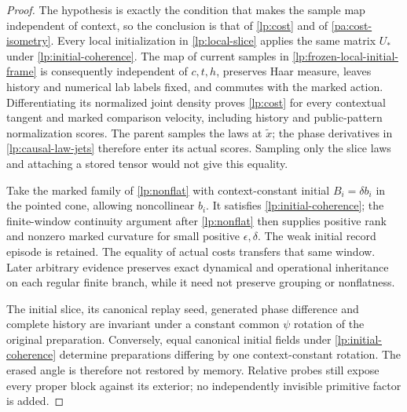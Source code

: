 \begin{proof}
The hypothesis is exactly the condition that makes the sample map independent of context, so the conclusion is that of \cref{lp:cost} and of \cref{pa:cost-isometry}. Every local initialization in \cref{lp:local-slice} applies the same matrix $U_*$ under \cref{lp:initial-coherence}. The map of current samples in \cref{lp:frozen-local-initial-frame} is consequently independent of $c,t,h$, preserves Haar measure, leaves history and numerical lab labels fixed, and commutes with the marked action. Differentiating its normalized joint density proves \cref{lp:cost} for every contextual tangent and marked comparison velocity, including history and public-pattern normalization scores. The parent samples the laws at $\widetilde x$; the phase derivatives in \cref{lp:causal-law-jets} therefore enter its actual scores. Sampling only the slice laws and attaching a stored tensor would not give this equality.

Take the marked family of \cref{lp:nonflat} with context-constant initial $B_i=\delta b_i$ in the pointed cone, allowing noncollinear $b_i$. It satisfies \cref{lp:initial-coherence}; the finite-window continuity argument after \cref{lp:nonflat} then supplies positive rank and nonzero marked curvature for small positive $\epsilon,\delta$. The weak initial record episode is retained. The equality of actual costs transfers that same window. Later arbitrary evidence preserves exact dynamical and operational inheritance on each regular finite branch, while it need not preserve grouping or nonflatness.

The initial slice, its canonical replay seed, generated phase difference and complete history are invariant under a constant common $\psi$ rotation of the original preparation. Conversely, equal canonical initial fields under \cref{lp:initial-coherence} determine preparations differing by one context-constant rotation. The erased angle is therefore not restored by memory. Relative probes still expose every proper block against its exterior; no independently invisible primitive factor is added.
\end{proof}

